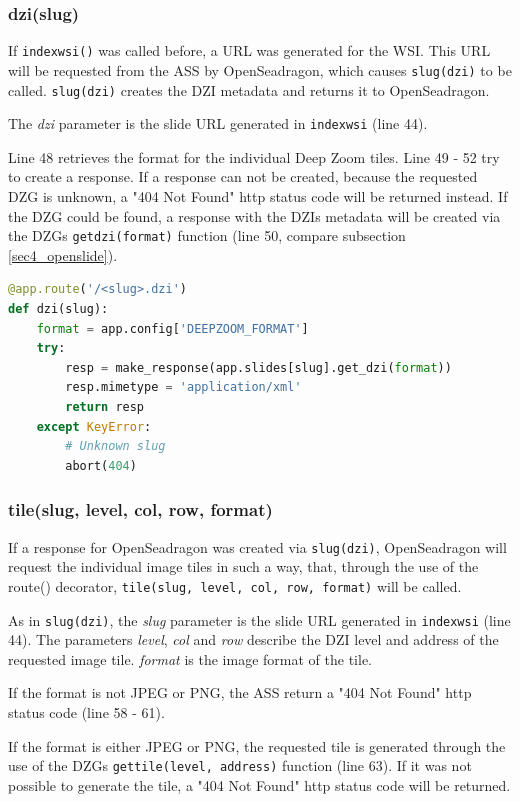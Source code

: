 \subsubsection{dzi(slug)}
If \texttt{index{\textunderscore}wsi()} was called before, a URL was generated for the WSI. This URL will be requested from the ASS by OpenSeadragon, which causes \texttt{slug(dzi)} to be called. \texttt{slug(dzi)} creates the DZI metadata and returns it to OpenSeadragon.

The \emph{dzi} parameter is the slide URL generated in \texttt{index{\textunderscore}wsi} (line 44).

Line 48 retrieves the format for the individual Deep Zoom tiles. Line 49 - 52 try to create a response. If a response can not be created, because the requested DZG is unknown, a "404 Not Found" http status code will be returned instead. If the DZG could be found, a response with the DZIs metadata will be created via the DZGs \texttt{get{\textunderscore}dzi(format)} function (line 50, compare subsection \ref{sec4_openslide}).

\begin{lstlisting}[language=Python, frame=single]
@app.route('/<slug>.dzi')
def dzi(slug):
	format = app.config['DEEPZOOM_FORMAT']
	try:
		resp = make_response(app.slides[slug].get_dzi(format))
		resp.mimetype = 'application/xml'
		return resp
	except KeyError:
		# Unknown slug
		abort(404)
\end{lstlisting}


\subsubsection{tile(slug, level, col, row, format)}
If a response for OpenSeadragon was created via \texttt{slug(dzi)}, OpenSeadragon will request the individual image tiles in such a way, that, through the use of the route() decorator, \texttt{tile(slug, level, col, row, format)} will be called.

As in \texttt{slug(dzi)}, the \emph{slug} parameter is the slide URL generated in \texttt{index{\textunderscore}wsi} (line 44). The parameters \emph{level}, \emph{col} and \emph{row} describe the DZI level and address of the requested image tile. \emph{format} is the image format of the tile.

If the format is not JPEG or PNG, the ASS return a "404 Not Found" http status code (line 58 - 61).

If the format is either JPEG or PNG, the requested tile is generated through the use of the DZGs \texttt{get{\textunderscore}tile(level, address)} function (line 63). If it was not possible to generate the tile, a "404 Not Found" http status code will be returned.

